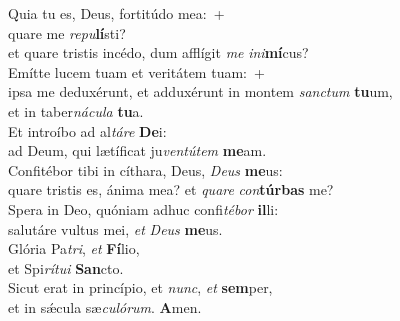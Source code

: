 \evenverse Quia tu es, Deus, fortitúdo mea:~+\\\evenverse  quare me \textit{re}\textit{pu}\textbf{lí}sti?~\*\\
\evenverse et quare tristis incédo, dum afflígit \textit{me} \textit{i}\textit{ni}\textbf{mí}cus?\\
\oddverse Emítte lucem tuam et veritátem tuam:~+\\
\oddverse  ipsa me deduxérunt, et adduxérunt in montem \textit{san}\textit{ctum} \textbf{tu}um,~\*\\
\oddverse et in taber\textit{ná}\textit{cu}\textit{la} \textbf{tu}a.\\
\evenverse Et introíbo ad al\textit{tá}\textit{re} \textbf{De}i:~\*\\
\evenverse ad Deum, qui lætíficat ju\textit{ven}\textit{tú}\textit{tem} \textbf{me}am.\\
\oddverse Confitébor tibi in cíthara, Deus, \textit{De}\textit{us} \textbf{me}us:~\*\\
\oddverse quare tristis es, ánima mea? et \textit{qua}\textit{re} \textit{con}\textbf{túr}\textbf{bas} me?\\
\evenverse Spera in Deo, quóniam adhuc confi\textit{té}\textit{bor} \textbf{il}li:~\*\\
\evenverse salutáre vultus mei, \textit{et} \textit{De}\textit{us} \textbf{me}us.\\
\oddverse Glória Pa\textit{tri}, \textit{et} \textbf{Fí}lio,~\*\\
\oddverse et Spi\textit{rí}\textit{tu}\textit{i} \textbf{San}cto.\\
\evenverse Sicut erat in princípio, et \textit{nunc}, \textit{et} \textbf{sem}per,~\*\\
\evenverse et in sǽcula sæ\textit{cu}\textit{ló}\textit{rum}. \textbf{A}men.\\
